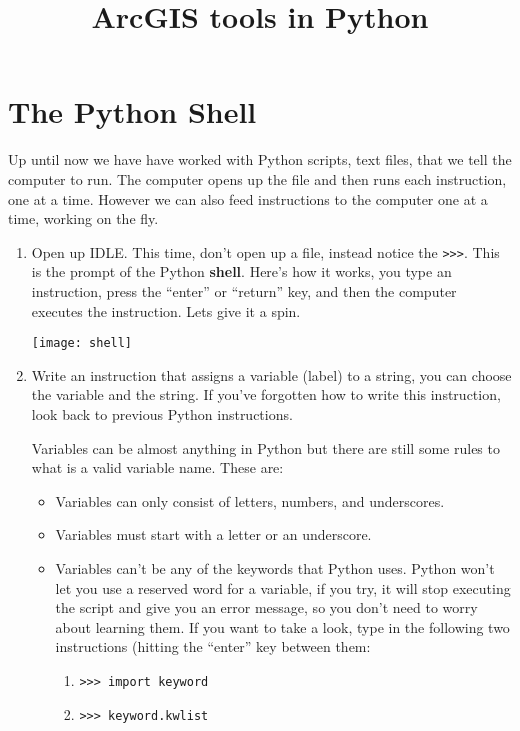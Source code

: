 \documentclass{article}
\begin{document}
\title{ArcGIS tools in Python}
\maketitle

\section{The Python Shell}
Up until now we have have worked with Python scripts, text files, that we tell the computer to run.  The computer opens up the file and then runs each instruction, one at a time.  However we can also feed instructions to the computer one at a time, working on the fly.
\begin{enumerate}
    \item Open up IDLE.  This time, don't open up a file, instead notice the \texttt{>>>}.  This is the prompt of the Python \textbf{shell}. Here's how it works, you type an instruction, press the ``enter'' or ``return'' key, and then the computer executes the instruction.  Lets give it a spin.

        \texttt{[image: shell]}
    \item Write an instruction that assigns a variable (label) to a string, you can choose the variable and the string.  If you've forgotten how to write this instruction, look back to previous Python instructions.

    Variables can be almost anything in Python but there are still some rules to what is a valid variable name.  These are:
    \begin{itemize}
        \item Variables can only consist of letters, numbers, and underscores.
        \item Variables must start with a letter or an underscore.
        \item Variables can't be any of the keywords that Python uses.  
              Python won't let you use a reserved word for a variable, if you try, it will stop executing the script and give you an error message, so you don't need to worry about learning them.  If you want to take a look, type in the following two instructions (hitting the ``enter'' key between them: 
              \begin{enumerate}
                  \item \texttt{>>> import keyword}
                  \item \texttt{>>> keyword.kwlist}
              \end{enumerate}


\end{itemize}
\end{enumerate}
\end{document}
